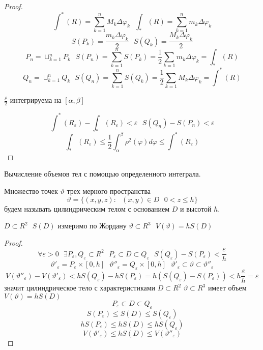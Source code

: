 \begin{proof}
  $$
  \int^* (R) = \sum_{k=1}^n M_k \Delta \varphi_k ~~~
  \int_* (R) = \sum_{k=1}^n m_k \Delta \varphi_k
  $$
  $$
  S(P_k) = \frac{m_k \Delta \varphi_k}{2} ~~~
  S(Q_k) = \frac{M_k \Delta \varphi_k}{2}
  $$
  $$
  P_n = \sqcup_{k=1}^n P_k ~~~
  S(P_n) = \sum_{k=1}^n S(P_k) = \frac{1}{2} \sum_{k=1} m_k \Delta \varphi_k =
  \int_* (R)
  $$
  $$
  Q_n = \sqcup_{k=1}^n Q_k ~~~
  S(Q_n) = \sum_{k=1}^n S(Q_k) = \frac{1}{2} \sum_{k=1} M_k \Delta \varphi_k =
  \int^* (R)
  $$

  $\frac{\rho}{2}$ интегрируема на $[\alpha, \beta]$

  $$
  \int^* (R_{\varepsilon}) - \int_* (R_{\varepsilon}) < \varepsilon ~~~
  S(Q_n) - S(P_n) < \varepsilon
  $$
  $$
  \int_* (R_{\varepsilon}) \le
  \frac{1}{2} \int_{\alpha}^{\beta} \rho^2(\varphi) d\varphi \le
  \int^* (R_{\varepsilon})
  $$
\end{proof}

\begin{title}[\Large]
  Вычисление объемов тел с помощью определенного интеграла.
\end{title}

\begin{defin}[цилиндра]
  Множество точек $\vartheta$ трех мерного пространства
  $$
  \vartheta = \{ (x,y,z): ~~~ (x,y) \in D ~~~ 0 < z \le h\}
  $$
  будем называть цилиндрическим телом с основанием $D$ и высотой $h$.
\end{defin}

\begin{theorem}
  $D \subset R^2 ~~~ S(D)$ измеримо по Жордану $\vartheta \subset R^3 ~~~
  V(\vartheta) = h S(D)$
\end{theorem}

\begin{proof}
  $$
  \forall \varepsilon > 0 ~~~
  \exists P_{\varepsilon}, Q_{\varepsilon} \subset R^2 ~~~
  P_{\varepsilon} \subset D \subset Q_{\varepsilon} ~~~
  S(Q_{\varepsilon}) - S(P_{\varepsilon}) < \frac{\varepsilon}{h}
  $$
  $$
  \vartheta'_{\varepsilon} = P_{\varepsilon} \times [0,h] ~~~
  \vartheta''_{\varepsilon} = Q_{\varepsilon} \times [0,h] ~~~
  \vartheta'_{\varepsilon} \subset \vartheta \subset \vartheta''_{\varepsilon}
  $$
  $$
  V(\vartheta''_{\varepsilon}) - V(\vartheta'_{\varepsilon}) <
  h S(Q_{\varepsilon}) - h S(P_{\varepsilon}) =
  h (S(Q_{\varepsilon}) - S(P_{\varepsilon})) <
  h \frac{\varepsilon}{h} = \varepsilon
  $$
  значит цилиндрическое тело с характеристиками $D \subset R^2$
  $\vartheta \subset R^3$ имеет объем $V(\vartheta) = h S(D)$
  $$
  P_{\varepsilon} \subset D \subset Q_{\varepsilon}
  $$
  $$
  S(P_{\varepsilon}) \le S(D) \le S(Q_{\varepsilon})
  $$
  $$
  hS(P_{\varepsilon}) \le hS(D) \le hS(Q_{\varepsilon})
  $$
  $$
  V(\vartheta'_{\varepsilon}) \le h S(D) \le V(\vartheta''_{\varepsilon})
  $$
\end{proof}

